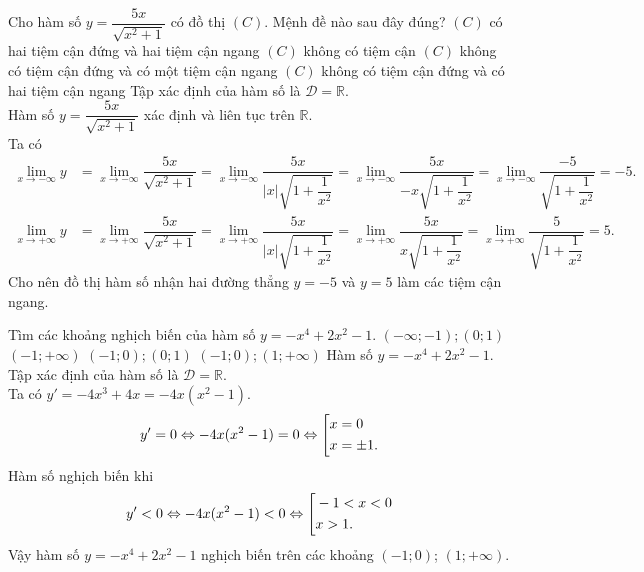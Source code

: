 \begin{ex}%
 Cho hàm số $y = \dfrac{5x}{\sqrt{x^2 + 1}}$ có đồ thị $(C)$. Mệnh đề nào sau đây đúng?
 \choice
  {$(C)$ có hai tiệm cận đứng và hai tiệm cận ngang}
  {$(C)$ không có tiệm cận}
  {$(C)$ không có tiệm cận đứng và có một tiệm cận ngang}
  {\True $(C)$ không có tiệm cận đứng và có hai tiệm cận ngang}
 \loigiai
  {
  Tập xác định của hàm số là $\mathscr{D} = \mathbb{R}$.\\
  Hàm số $y = \dfrac{5x}{\sqrt{x^2 + 1}}$ xác định và liên tục trên $\mathbb{R}$.\\
  Ta có
  \begin{align*}
   \lim\limits_{x \to -\infty} y & = \lim\limits_{x \to -\infty} \dfrac{5x}{\sqrt{x^2+1}} = \lim\limits_{x \to -\infty} \dfrac{5x}{|x|\sqrt{1+\dfrac{1}{x^2}}}= \lim\limits_{x \to -\infty}\dfrac{5x}{-x \sqrt{1 + \dfrac{1}{x^2}}} = \lim\limits_{x \to -\infty} \dfrac{-5}{\sqrt{1 + \dfrac{1}{x^2}}} = -5. \\
   \lim\limits_{x \to +\infty} y & = \lim\limits_{x \to +\infty} \dfrac{5x}{\sqrt{x^2+1}} = \lim\limits_{x \to +\infty} \dfrac{5x}{|x|\sqrt{1+\dfrac{1}{x^2}}}= \lim\limits_{x \to +\infty}\dfrac{5x}{x \sqrt{1 + \dfrac{1}{x^2}}} = \lim\limits_{x \to +\infty} \dfrac{5}{\sqrt{1 + \dfrac{1}{x^2}}} = 5.
  \end{align*}
  Cho nên đồ thị hàm số nhận hai đường thẳng $y = -5$ và $y = 5$ làm các tiệm cận ngang.
  }
\end{ex}

\begin{ex}%
 Tìm các khoảng nghịch biến của hàm số $y = -x^4 + 2x^2 - 1$.
 \choice
  {$(-\infty;-1); (0;1)$}
  {$(-1;+\infty)$}
  {$(-1;0); (0;1)$}
  {\True $(-1;0); (1;+\infty)$}
 \loigiai
  {
  Hàm số $y = -x^4 + 2x^2 - 1$.\\
  Tập xác định của hàm số là $\mathscr{D} = \mathbb{R}$.\\
  Ta có $y' = -4x^3 + 4x = -4x(x^2 - 1)$.
  \begin{eqnarray*}
   y' = 0 \Leftrightarrow -4x(x^2 - 1) = 0 \Leftrightarrow \left[\begin{aligned}& x = 0 \\& x = \pm 1.\end{aligned}\right.
  \end{eqnarray*}
  Hàm số nghịch biến khi
  \begin{eqnarray*}
   y' < 0 \Leftrightarrow -4x(x^2 - 1) < 0 \Leftrightarrow \left[\begin{aligned}& -1 < x < 0 \\& x > 1.\end{aligned}\right.
  \end{eqnarray*}
  Vậy hàm số $y = -x^4 + 2x^2 - 1$ nghịch biến trên các khoảng $(-1;0)$; $(1; +\infty)$.
  }
\end{ex}

